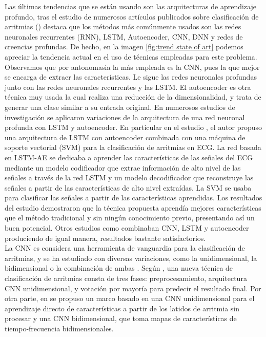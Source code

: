     Las últimas tendencias que se están usando son las arquitecturas de aprendizaje profundo, tras el estudio de numerosos artículos publicados sobre clasificación de arritmias (\cite{ohshuli,GaoJunLi,chenchen, zhang2020ecg,lynn2019deep,yao2020multi,gao2021end,tan2018application,sajjad2020novel,zheng2020automatic,wang2019photovoltaic,kim2019predicting,kim2020ensemble,geng2020epileptic,fu2019hybrid,huang2020classification,lih2020comprehensive,wei2019early,kong2019convolution,yildirim2019new,cai2020accurate,hou2019lstm}) destaca que los métodos más comúnmente usados son las redes neuronales recurrentes (RNN), LSTM, Autoencoder, CNN,  DNN y redes de creencias profundas. De hecho, en la imagen \ref{fig:trend state of art} podemos apreciar la tendencia actual en el uso de técnicas empleadas para este problema. Observamos que por antonomasia la más empleada es la CNN, pues la que mejor se encarga de extraer las características. Le sigue las redes neuronales profundas junto con las redes neuronales recurrentes y las LSTM. El autoencoder es otra técnica muy usada la cual realiza una reducción de la dimensionalidad, y trata de generar una clase similar a su entrada original. En numerosos estudios de investigación se aplicaron variaciones de la arquitectura de una red neuronal profunda con LSTM y autoencoder. En particular en el estudio \cite{hou2019lstm}, el autor propuso una arquitectura de LSTM con autoencoder combinada con una máquina de soporte vectorial (SVM) para la clasificación de arritmias en ECG. La red basada en LSTM-AE se dedicaba a aprender las características de las señales del ECG mediante un modelo codificador que extrae información de alto nivel de las señales a través de la red LSTM y un modelo decodificador que reconstruye las señales a partir de las características de alto nivel extraídas. La SVM se usaba para clasificar las señales a partir de las características aprendidas. Los resultados del estudio demostraron que la técnica propuesta aprendía mejores características que el método tradicional y sin ningún conocimiento previo, presentando así un buen potencial. Otros estudios como \cite{yildirim2019new} combinaban CNN, LSTM y autoencoder produciendo de igual manera, resultados bastante satisfactorios.\\
    
    La CNN es considera una herramienta de vanguardia para la clasiﬁcación de arritmias, y se ha estudiado con diversas variaciones, como la unidimensional, la bidimensional o la combinación de ambas \cite{xiao2020heart,noman2019short}. Según \cite{xiao2020heart}, una nueva técnica de clasificación de arritmias consta de tres fases: preprocesamiento, arquitectura CNN unidimensional, y votación por mayoría para predecir el resultado final. Por otra parte, en \cite{noman2019short} se propuso un marco basado en una CNN unidimensional para el aprendizaje directo de características a partir de los latidos de arritmia sin procesar y una CNN bidimensional, que toma mapas de características de tiempo-frecuencia bidimensionales. \\ 
    
